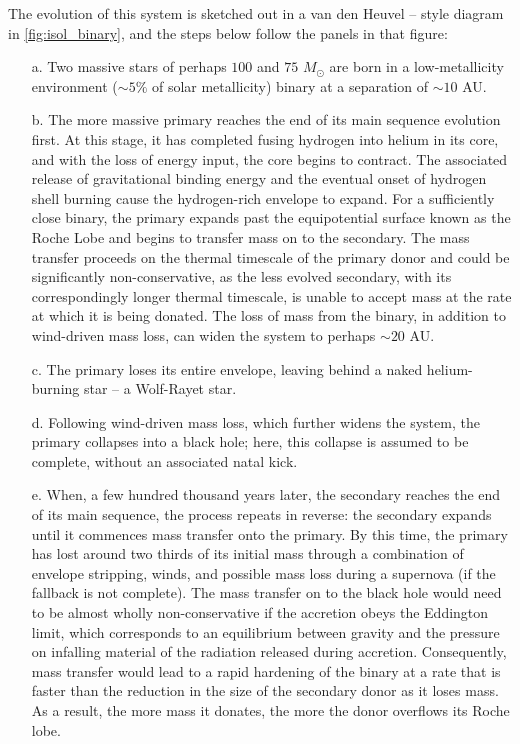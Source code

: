 \documentclass[iop,onecolumn]{revtex4-1}
\begin{document}
The evolution of this system is sketched out in a van den Heuvel -- style diagram in \autoref{fig:isol_binary}, and the steps below follow the panels in that figure:
\begin{enumerate}  
\item[a.] Two massive stars of perhaps $100$ and $75$ $M_{\odot}$ are born in a low-metallicity environment ($\sim 5\%$ of solar metallicity)  binary at a separation of $\sim 10$ AU.  
\item[b.] The more massive primary reaches the end of its main sequence evolution first.  At this stage, it has completed fusing hydrogen into helium in its core, and with the loss of energy input, the core begins to contract.  The associated release of gravitational binding energy and the eventual onset of hydrogen shell burning cause the hydrogen-rich envelope to expand.  For a sufficiently close binary, the primary expands past the equipotential surface known as the Roche Lobe and begins to transfer mass on to the secondary.  The mass transfer proceeds on the thermal timescale of the primary donor and could be significantly non-conservative, as the less evolved secondary, with its correspondingly longer thermal timescale, is unable to accept mass at the rate at which it is being donated.  The loss of mass from the binary, in addition to wind-driven mass loss, can widen the system to perhaps $\sim 20$ AU.  
\item[c.] The primary loses its entire envelope, leaving behind a naked helium-burning star -- a Wolf-Rayet star.  
\item[d.] Following wind-driven mass loss, which further widens the system, the primary collapses into a black hole; here, this collapse is assumed to be complete, without an associated natal kick.  
\item[e.] When, a few hundred thousand years later, the secondary reaches the end of its main sequence, the process repeats in reverse: the secondary expands until it commences mass transfer onto the primary.  By this time, the primary has lost around two thirds of its initial mass through a combination of envelope stripping, winds, and possible mass loss during a supernova (if the fallback is not complete).  The mass transfer on to the black hole would need to be almost wholly non-conservative if the accretion obeys the Eddington limit, which corresponds to an equilibrium between gravity and the pressure on infalling material of the radiation released during accretion.  Consequently, mass transfer would lead to a rapid hardening of the binary at a rate that is faster than the reduction in the size of the secondary donor as it loses mass.  As a result, the more mass it donates, the more the donor overflows its Roche lobe.  

\end{enumerate}
\end{document}
